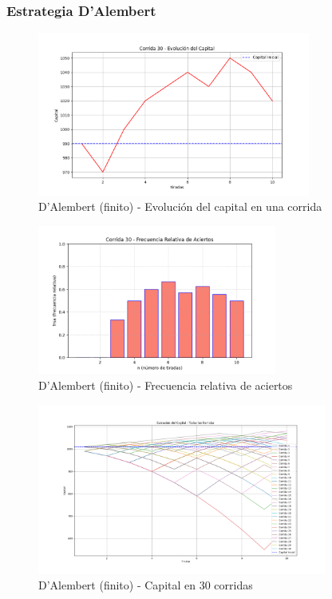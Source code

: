 \documentclass{article}
\begin{document}
\subsubsection*{Estrategia D’Alembert}


\begin{figure}[H]
    \centering
    \includegraphics[width=0.8\textwidth]{./images/capital_corrida_30_d_f.png}
    \caption{D’Alembert (finito) - Evolución del capital en una corrida}
\end{figure}

\begin{figure}[H]
    \centering
    \includegraphics[width=0.7\textwidth]{./images/frsa_corrida_30_d_f.png}
    \caption{D’Alembert (finito) - Frecuencia relativa de aciertos}
\end{figure}

\begin{figure}[H]
    \centering
    \includegraphics[width=0.85\textwidth]{./images/capital_todas_corridas_d_f.png}
    \caption{D’Alembert (finito) - Capital en 30 corridas}
\end{figure}
\end{document}
